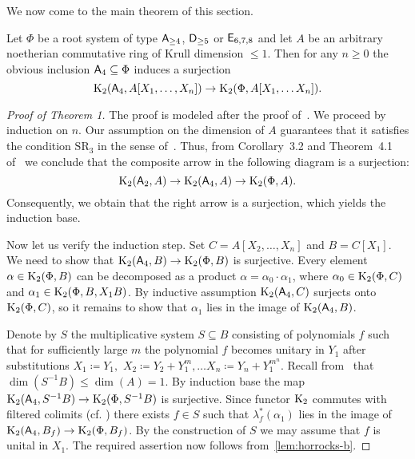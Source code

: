 We now come to the main theorem of this section.
\begin{thm}\label{thm:early-stability}
Let $\Phi$ be a root system of type $\mathsf{A}_{\geq 4}$, $\mathsf{D}_{\geq 5}$ or $\mathsf{E}_{6,7,8}$ and let $A$ be an arbitrary noetherian commutative ring of Krull dimension $\leq 1$.
Then for any $n \geq 0$ the obvious inclusion $\mathsf{A}_4 \subseteq \Phi$ induces a surjection
\[\operatorname{K}_2(\mathsf{A}_4, A[X_1,\ldots, X_n]) \to \operatorname{K}_2(\Phi, A[X_1, \ldots X_n]).\]
\end{thm}
\begin{proof}[Proof of Theorem 1]
    The proof is modeled after the proof of~\cite[Theorem~5.3]{Tu83}.
    We proceed by induction on $n$.
    Our assumption on the dimension of $A$ guarantees that it satisfies the condition $\mathrm{SR}_3$ in the sense of~\cite{St78}.
    Thus, from Corollary~3.2 and Theorem~4.1 of~\cite{St78} we conclude that the composite arrow in the following diagram is a surjection:
    \[\operatorname{K}_2(\mathsf{A}_2, A) \to \operatorname{K}_2(\mathsf{A}_4, A) \to \operatorname{K}_2(\Phi, A).\]
    Consequently, we obtain that the right arrow is a surjection, which yields the induction base.

    Now let us verify the induction step.
    Set $C = A[X_2, \ldots , X_n]$ and $B = C[X_1]$.
    We need to show that $\operatorname{K}_2(\mathsf{A}_4, B) \to \operatorname{K}_2(\Phi, B)$ is surjective.
    Every element $\alpha \in \operatorname{K}_2(\Phi, B)$ can be decomposed as a product $\alpha = \alpha_0 \cdot \alpha_1$,
      where $\alpha_0 \in \operatorname{K}_2(\Phi, C)$ and $\alpha_1 \in \operatorname{K}_2(\Phi, B, X_1 B)$.
    By inductive assumption $\operatorname{K}_2(\mathsf{A}_4, C)$ surjects onto $\operatorname{K}_2(\Phi, C)$, so it remains to show that $\alpha_1$ lies in the image of $\operatorname{K}_2(\mathsf{A}_4, B)$.

    Denote by $S$ the multiplicative system $S \subseteq B$ consisting of polynomials $f$ such that for sufficiently large $m$
    the polynomial $f$ becomes unitary in $Y_1$ after substitutions $X_1 \coloneqq Y_1,$ $X_2 \coloneqq Y_2 + Y_1^m, \ldots X_n \coloneqq Y_n + Y_1^{m^n}$.
    Recall from~\cite[\S~6]{Su77} that $\dim(S^{-1}B) \leq \dim(A) = 1$.
    By induction base the map $\operatorname{K}_2(\mathsf{A}_4, S^{-1}B) \to \operatorname{K}_2(\Phi, S^{-1}B)$ is surjective.
    Since functor $\operatorname{K}_2$ commutes with filtered colimits (cf. \cite[Lemma~3.3]{LSV2}) there exists $f \in S$ such that $\lambda^*_f(\alpha_1)$ lies in the image of $\operatorname{K}_2(\mathsf{A}_4, B_f) \to \operatorname{K}_2(\Phi, B_f)$.
    By the construction of $S$ we may assume that $f$ is unital in $X_1$.
    The required assertion now follows from~\cref{lem:horrocks-b}.
\end{proof}